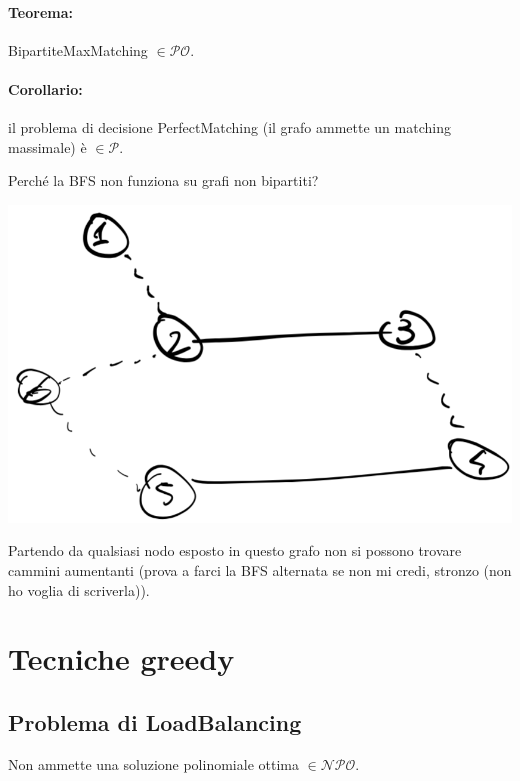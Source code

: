 \paragraph{Teorema:} BipartiteMaxMatching $\in \mathcal{PO}$.\\

\paragraph{Corollario:} il problema di decisione PerfectMatching (il grafo ammette un matching massimale) è $\in \mathcal{P}$.\\

\newpage

Perché la BFS non funziona su grafi non bipartiti?
\begin{center}
	\includegraphics[width=0.8\columnwidth]{img/bipartito1}
\end{center}
Partendo da qualsiasi nodo esposto in questo grafo non si possono trovare cammini aumentanti (prova a farci la BFS alternata se non mi credi, stronzo (non ho voglia di scriverla)).\\

\newpage

\section{Tecniche greedy}

\subsection{Problema di LoadBalancing}
Non ammette una soluzione polinomiale ottima $\in \mathcal{NPO}$.\\

